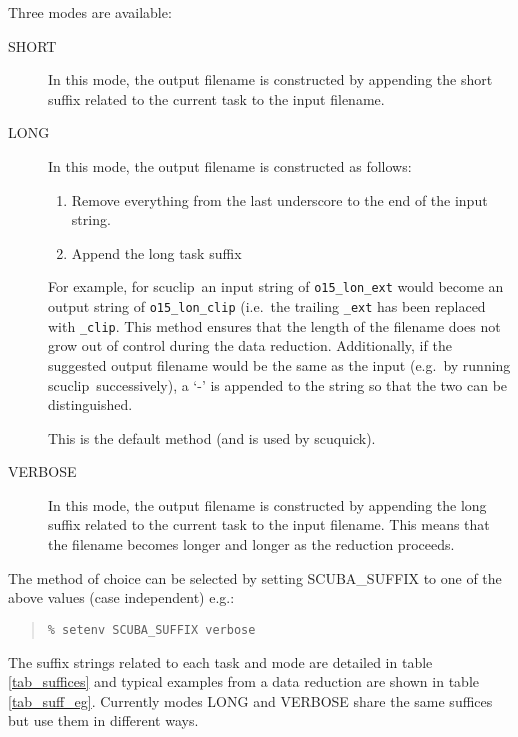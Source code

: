 \documentclass[twoside,11pt]{article}
\newcommand{\task}[1]{{\sf #1}}
\newcommand{\scuquick}{\htmlref{\task{scuquick}}{SCUQUICK}}
\newcommand{\scuclip}{\htmlref{\task{scuclip}}{SCUCLIP}}
\newenvironment{myquote}{\begin{quote}\begin{small}}{\end{small}\end{quote}}
\newcommand{\htmlref}[2]{#1}
\begin{document}
Three modes are available:
\begin{description}

\item[\textsf{SHORT}] \mbox{}

In this mode, the output filename is constructed by appending the short
suffix related to the current task to the input filename. 

\item[\textsf{LONG}] \mbox{}

In this mode, the output filename is constructed as follows:
\begin{enumerate}
\item Remove everything from the last underscore to the end of the input
string. 
\item Append the long task suffix
\end{enumerate}

For example, for \scuclip\ an input string of \texttt{o15\_lon\_ext} would
become an output string of \texttt{o15\_lon\_clip} (i.e.\ the trailing
\texttt{\_ext} has been replaced with \texttt{\_clip}. This method ensures
that the length of the filename does not grow out of control during the data
reduction. Additionally, if the suggested output filename would be the same as 
the input (e.g.\ by running \scuclip\ successively), a `-' is appended to
the string so that the two can be distinguished.

This is the default method (and is used by \scuquick).

\item[\textsf{VERBOSE}] \mbox{}

In this mode, the output filename is constructed by appending the long suffix
related to the current task to the input filename. This means that
the filename becomes longer and longer as the reduction proceeds.

\end{description}

The method of choice can be selected by setting SCUBA\_SUFFIX to one of the
above values (case independent) e.g.:
\begin{myquote}
\begin{verbatim}
% setenv SCUBA_SUFFIX verbose
\end{verbatim}
\end{myquote}
The suffix strings related to each task and mode are detailed in table
\ref{tab_suffices} and typical examples from a data reduction are shown in
table \ref{tab_suff_eg}. Currently modes \textsf{LONG} and \textsf{VERBOSE}
share the same suffices but use them in different ways.
\end{document}
